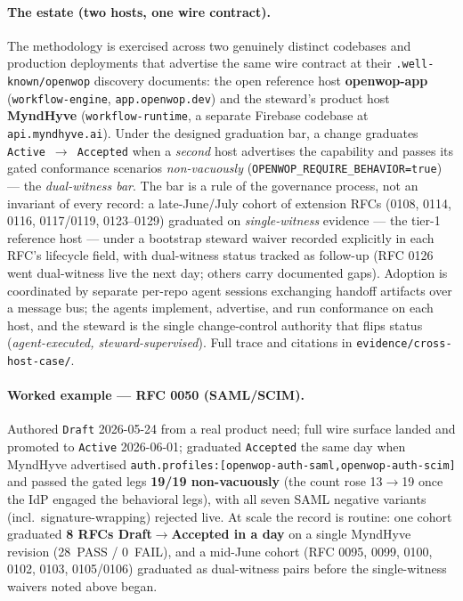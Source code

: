 \documentclass[11pt]{article}
\newcommand{\envreq}{\texttt{OPENWOP\_\allowbreak REQUIRE\_\allowbreak BEHAVIOR=true}}
\begin{document}
\paragraph{The estate (two hosts, one wire contract).} The methodology is exercised across two
genuinely distinct codebases and production deployments that advertise the same wire contract at
their \texttt{.well-known/openwop} discovery documents: the open reference host
\textbf{openwop-app} (\texttt{workflow-engine}, \texttt{app.openwop.dev}) and the steward's product
host \textbf{MyndHyve} (\texttt{workflow-runtime}, a separate Firebase codebase at
\texttt{api.myndhyve.ai}). Under the designed graduation bar, a change graduates
\texttt{Active}~$\rightarrow$~\texttt{Accepted} when a \emph{second} host advertises the capability
and passes its gated conformance scenarios \emph{non-vacuously} (\envreq) --- the \emph{dual-witness
bar}. The bar is a rule of the governance process, not an invariant of every record: a
late-June/July cohort of extension RFCs (0108, 0114, 0116, 0117/0119, 0123--0129) graduated on
\emph{single-witness} evidence --- the tier-1 reference host --- under a bootstrap steward waiver
recorded explicitly in each RFC's lifecycle field, with dual-witness status tracked as follow-up
(RFC 0126 went dual-witness live the next day; others carry documented gaps).
Adoption is coordinated by separate per-repo agent sessions exchanging handoff artifacts over a
message bus; the agents implement, advertise, and run conformance on each host, and the steward is
the single change-control authority that flips status (\emph{agent-executed, steward-supervised}).
Full trace and citations in \texttt{evidence/cross-host-case/}.

\paragraph{Worked example --- RFC 0050 (SAML/SCIM).} Authored \texttt{Draft} 2026-05-24 from a real
product need; full wire surface landed and promoted to \texttt{Active} 2026-06-01; graduated
\texttt{Accepted} the same day when MyndHyve advertised
\texttt{auth.profiles:}\allowbreak\texttt{[openwop-auth-saml,}\allowbreak\texttt{openwop-auth-scim]} and passed the gated legs
\textbf{19/19 non-vacuously} (the count rose 13$\rightarrow$19 once the IdP engaged the behavioral
legs), with all seven SAML negative variants (incl.\ signature-wrapping) rejected live. At scale the
record is routine: one cohort graduated \textbf{8 RFCs Draft$\rightarrow$Accepted in a day} on a
single MyndHyve revision (28~PASS / 0~FAIL), and a mid-June cohort (RFC 0095, 0099, 0100, 0102, 0103,
0105/0106) graduated as dual-witness pairs before the single-witness waivers noted above began.
\end{document}
